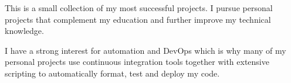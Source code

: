
This is a small collection of my most successful projects. I pursue personal projects that complement my education and further improve my technical knowledge.

\hfill\break

I have a strong interest for automation and DevOps which is why many of my personal projects use continuous integration tools together with extensive scripting to automatically format, test and deploy my code.
